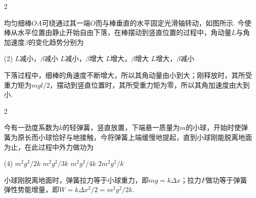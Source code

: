 \begin{paracol}{2}
\begin{problem}
    均匀细棒$OA$可绕通过其一端$O$而与棒垂直的水平固定光滑轴转动，如图所示. 今使棒从水平位置由静止开始自由下落，在棒摆动到竖直位置的过程中，角动量$L$与角加速度$\beta$的变化趋势分别为
    \begin{tasks}(2)
    \task $L$减小，$\beta$减小
    \task $L$减小，$\beta$增大
    \task $L$增大，$\beta$增大
    \task[\true] $L$增大，$\beta$减小
    \end{tasks}
    \switchcolumn\vspace*{\fill}\centering
    \vspace*{\fill}
\end{problem}
\end{paracol}
\begin{solution}
    下落过程中，细棒的角速度不断增大，所以其角动量由小到大；刚释放时，其所受重力矩为$mgl/2$，摆动到竖直位置时，其所受重力矩为零，所以其角加速度由大到小.
\end{solution}

\begin{paracol}{2}
    \begin{problem}
        今有一劲度系数为$k$的轻弹簧，竖直放置，下端悬一质量为$m$的小球，开始时使弹簧为原长而小球恰好与地接触，今将弹簧上端缓慢地提起，直到小球刚能脱离地面为止，在此过程中外力做功为
        \begin{tasks}(4)
            \task[\true] $m^2g^2/2k$
            \task $m^2g^2/3k$
            \task $m^2g^2/4k$
            \task $2m^2g^2/k$
        \end{tasks}
        \switchcolumn\vspace*{\fill}\centering
        \vspace*{\fill}
    \end{problem}
\end{paracol}
\begin{solution}
    小球刚脱离地面时，弹簧拉力等于小球重力，即$mg=k\Delta x$；拉力$F$做功等于弹簧弹性势能增量，即$W=k\Delta x^2/2=m^2g^2/2k$.
\end{solution}

